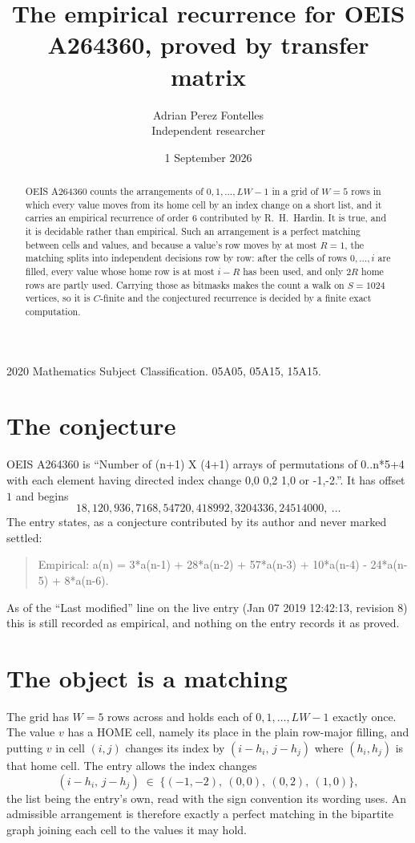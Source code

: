\documentclass[11pt,a4paper]{article}
\title{The empirical recurrence for OEIS A264360, proved by transfer matrix}
\author{Adrian Perez Fontelles\\ \small Independent researcher}
\date{1 September 2026}
\theoremstyle{plain}
\theoremstyle{definition}
\begin{document}
\maketitle

\begin{abstract}
OEIS A264360 counts the arrangements of $0,1,\dots,LW-1$ in a grid of $W=5$ rows in which
every value moves from its home cell by an index change on a short list, and it carries an
empirical recurrence of order $6$ contributed by R.~H.~Hardin. It is true, and it is
decidable rather than empirical. Such an arrangement is a perfect matching between cells and
values, and because a value's row moves by at most $R=1$, the matching splits into
independent decisions row by row: after the cells of rows $0,\dots,i$ are filled,
every value whose home row is at most $i-R$ has been used, and only $2R$ home rows are
partly used. Carrying those as bitmasks makes the count a walk on $S=1024$ vertices, so it is
$C$-finite and the conjectured recurrence is decided by a finite exact computation.
\end{abstract}

\noindent\small 2020 Mathematics Subject Classification. 05A05, 05A15, 15A15.\normalsize

\section{The conjecture}

OEIS A264360 is ``Number of (n+1) X (4+1) arrays of permutations of 0..n*5+4 with each element having directed index change 0,0 0,2 1,0 or -1,-2.''. It has offset $1$ and begins
\[
18, 120, 936, 7168, 54720, 418992, 3204336, 24514000,\ \dots
\]
The entry states, as a conjecture contributed by its author and never marked settled:
\begin{quote}
Empirical: a(n) = 3*a(n-1) + 28*a(n-2) + 57*a(n-3) + 10*a(n-4) - 24*a(n-5) + 8*a(n-6).
\end{quote}
As of the ``Last modified'' line on the live entry (Jan 07 2019 12:42:13, revision 8) this is still
recorded as empirical, and nothing on the entry records it as proved.

\section{The object is a matching}

The grid has $W=5$ rows across and holds each of $0,1,\dots,LW-1$ exactly once. The value
$v$ has a HOME cell, namely its place in the plain row-major filling, and putting $v$ in cell
$(i,j)$ changes its index by $(i-h_i,\,j-h_j)$ where $(h_i,h_j)$ is that home cell. The entry
allows the index changes
\[
(i-h_i,\,j-h_j)\;\in\;\{(-1,-2),\ (0,0),\ (0,2),\ (1,0)\},
\]
the list being the entry's own, read with the sign convention its wording uses. An admissible
arrangement is therefore exactly a perfect matching in the bipartite graph joining each cell to
the values it may hold.
\end{document}
